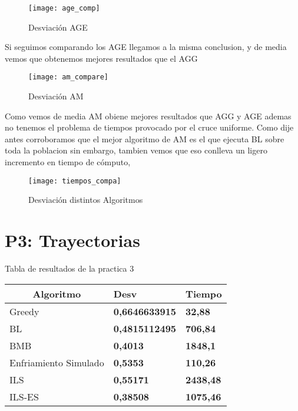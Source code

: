 \begin{figure}[h]
  \centering
  \texttt{[image: age\_comp]}
  \caption{Desviación AGE}
  \label{gra2}
\end{figure}

Si seguimos comparando los AGE llegamos a la misma conclusion, y de media vemos que obtenemos mejores resultados que el AGG

\begin{figure}[h]
  \centering
  \texttt{[image: am\_compare]}
  \caption{Desviación AM}
  \label{gra2}
\end{figure}

Como vemos de media AM obiene mejores resultados que AGG y AGE ademas no tenemos el problema de tiempos provocado por el cruce uniforme.
Como dije antes corroboramos que el mejor algoritmo de AM es el que ejecuta BL sobre toda la poblacion sin embargo, tambien vemos que eso conlleva un ligero incremento
en tiempo de cómputo,

\begin{figure}[H]
  \centering
  \texttt{[image: tiempos\_compa]}
  \caption{Desviación distintos Algoritmos}
  \label{fig:tiem}
\end{figure}

\section{P3: Trayectorias}
Tabla de resultados de la practica 3 

\begin{table}[H]
  \begin{tabular}{|l|l|l|}
  \hline
  \multicolumn{1}{|c|}{Algoritmo}   & \multicolumn{1}{l|}{Desv}                   & \multicolumn{1}{c|}{Tiempo}          \\\hline
  Greedy                            & \textbf{0,6646633915}                       & \textbf{32,88}                       \\\hline
  BL                                & \textbf{0,4815112495}                       & \textbf{706,84}                      \\\hline
  BMB                               & \textbf{0,4013}                             & \textbf{1848,1}                      \\\hline
  Enfriamiento Simulado             & \textbf{0,5353}                             & \textbf{110,26}                      \\\hline
  ILS                               & \textbf{0,55171}                            & \textbf{2438,48}                     \\\hline                
  ILS-ES                            & \textbf{0,38508}                            & \textbf{1075,46}                     \\\hline                                               
  \end{tabular}
  \end{table}


